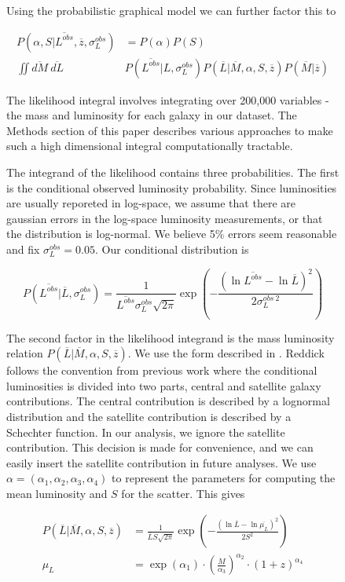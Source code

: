 \documentclass[\docopts]{\docclass}
\begin{document}
\begin{figure}[h!]
Using the probabilistic graphical model we can further factor this to

\begin{align*}P(\alpha, S| \overline{L^{obs}}, \overline{z}, \sigma_L^{obs}) &= P(\alpha)P(S) \\
 \iint \overline{dM}\ \overline{dL}\ &P(\overline{L^{obs}}| L, \sigma_L^{obs}) P(\overline{L}|\overline{M},\alpha,S,\overline{z})P(\overline{M}|\overline{z})
\end{align*}

The likelihood integral involves integrating over 200,000 variables - the mass and luminosity for each galaxy in our dataset. 
The Methods section of this paper describes various approaches to make such a high dimensional integral computationally tractable. 

The integrand of the likelihood contains three probabilities. 
The first is the conditional observed luminosity probability. 
Since luminosities are usually reporeted in log-space, we assume that there are gaussian errors in the log-space luminosity measurements, or that the distribution is log-normal. 
We believe 5\% errors seem reasonable and fix $\sigma_L^{obs} = 0.05$. Our conditional distribution is 

$$P(\overline{L^{obs}}| \overline{L}, \sigma_L^{obs}) = \frac{1}{\overline{L^{obs}}\sigma_L^{obs}\sqrt{2\pi}}\exp\left(-\frac{(\ln \overline{L^{obs}} - \ln \overline{L})^2}{2\sigma_L^{obs\ 2}}\right)$$

The second factor in the likelihood integrand is the mass luminosity relation $P(\overline{L}|\overline{M},\alpha,S,\overline{z})$. 
We use the form described in \cite{reddick}. 
Reddick follows the convention from previous work where the conditional luminosities is divided into two parts, central and satellite galaxy contributions. 
The central contribution is described by a lognormal distribution and the satellite contribution is described by a Schechter function. 
In our analysis, we ignore the satellite contribution. 
This decision is made for convenience, and we can easily insert the satellite contribution in future analyses. 
We use $\alpha = (\alpha_1, \alpha_2, \alpha_3, \alpha_4)$ to represent the parameters for computing the mean luminosity and $S$ for the scatter. 
This gives

\begin{align*}
P(\overline{L}|\overline{M},\alpha,S,\overline{z}) &= \frac{1}{\overline{L}S\sqrt{2\pi}}\exp\left(-\frac{(\ln \overline{L} - \ln \overline{\mu_L})^2}{2S^{2}}\right)\\
\mu_L &= \exp(\alpha_1) \cdot \left(\frac{M}{\alpha_3}\right)^{\alpha_2} \cdot (1+z)^{\alpha_4}\\
\end{align*}


\end{figure}
\end{document}
